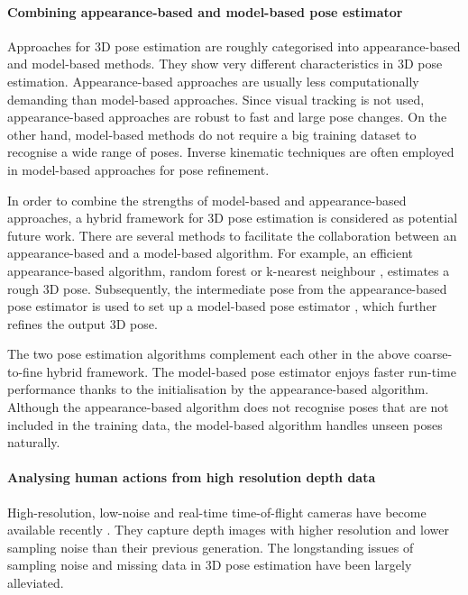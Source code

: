 \paragraph{Combining appearance-based and model-based pose estimator}

Approaches for 3D pose estimation are roughly categorised into appearance-based and model-based methods.  They show very different characteristics in 3D pose estimation.
Appearance-based approaches are usually less computationally demanding than model-based approaches. 
Since visual tracking is not used, appearance-based approaches are robust to fast and large pose changes.
On the other hand, model-based methods do not require a big training dataset to recognise a wide range of poses. Inverse kinematic techniques are often employed in model-based approaches for pose refinement. 

In order to combine the strengths of model-based and appearance-based approaches, a hybrid framework for 3D pose estimation is considered as potential future work.
There are several methods to facilitate the collaboration between an appearance-based and a model-based algorithm.  
For example, an efficient appearance-based algorithm, \eg random forest or k-nearest neighbour \cite{Keskin2012, Baak2011, Ye2011}, estimates a rough 3D pose. Subsequently, the intermediate pose from the appearance-based pose estimator is used to set up a model-based pose estimator \cite{Pons-Moll2011, Sigal2012, Oikonomidis2011}, which further refines the output 3D pose.

The two pose estimation algorithms complement each other in the above coarse-to-fine hybrid framework.
The model-based pose estimator enjoys faster run-time performance thanks to the initialisation by the appearance-based algorithm. Although the appearance-based algorithm does not recognise poses that are not included in the training data, the model-based algorithm handles unseen poses naturally.

\paragraph{Analysing human actions from high resolution depth data}

High-resolution, low-noise and real-time time-of-flight cameras have become available recently \cite{Nair2012}. 
They capture depth images with higher resolution and lower sampling noise than their previous generation.
The longstanding issues of sampling noise and missing data in 3D pose estimation have been largely alleviated. 

